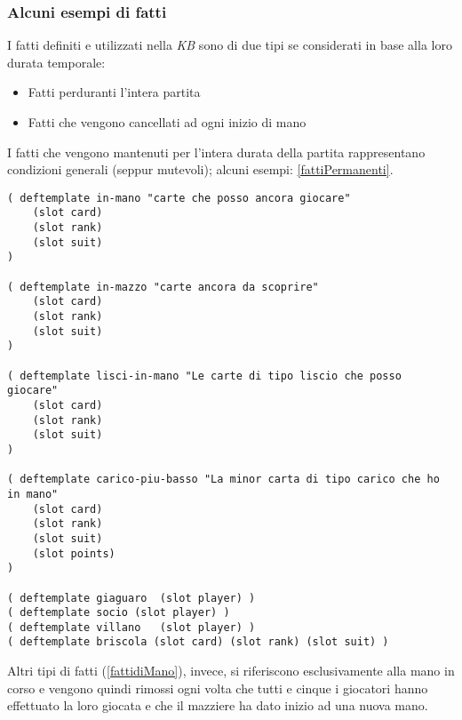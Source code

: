 \subsubsection*{Alcuni esempi di fatti}


I fatti definiti e utilizzati nella \emph{KB} sono di due tipi se considerati in base alla loro durata temporale:
\begin{itemize}
   \item Fatti perduranti l'intera partita
   \item Fatti che vengono cancellati ad ogni inizio di mano
\end{itemize}

I fatti che vengono mantenuti per l'intera durata della partita rappresentano condizioni generali (seppur mutevoli); alcuni esempi: \ref{fattiPermanenti}.


\lstset{numbers=left, numberstyle=\tiny, stepnumber=1,firstnumber=1,
  numbersep=5pt,language=Java,
stringstyle=\ttfamily,
basicstyle=\footnotesize, 
showstringspaces=false,
breaklines=true
}

\begin{lstlisting}[caption={Alcuni template di fatti che rimangono nella \emph{KB} per l'intera partita. Il contenuto di questi fatti viene aggiornato mano a mano che nuove informazioni si rendono disponibili all'agente giocatore}, label=fattiPermanenti]
( deftemplate in-mano "carte che posso ancora giocare"
    (slot card)
    (slot rank)
    (slot suit)
)

( deftemplate in-mazzo "carte ancora da scoprire"
    (slot card)
    (slot rank)
    (slot suit)
)

( deftemplate lisci-in-mano "Le carte di tipo liscio che posso giocare"
    (slot card)
    (slot rank)
    (slot suit)
)

( deftemplate carico-piu-basso "La minor carta di tipo carico che ho in mano"
    (slot card)
    (slot rank)
    (slot suit)
    (slot points)
)

( deftemplate giaguaro  (slot player) )
( deftemplate socio (slot player) )
( deftemplate villano   (slot player) )
( deftemplate briscola (slot card) (slot rank) (slot suit) )
\end{lstlisting}




Altri tipi di fatti (\ref{fattidiMano}), invece, si riferiscono esclusivamente alla mano in corso e vengono quindi rimossi ogni volta che tutti e cinque i giocatori hanno effettuato la loro giocata e che il mazziere ha dato inizio ad una nuova mano.

